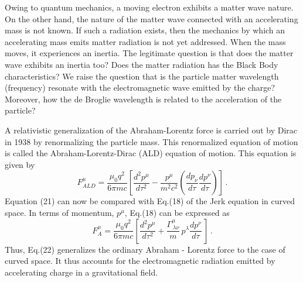 \documentclass[12pt]{article}
\begin{document}
Owing to  quantum mechanics, a moving electron exhibits a matter wave nature. On the other hand, the nature of the matter wave connected with an accelerating mass is not known. If such a radiation exists, then the mechanics by which an accelerating mass emits matter radiation is not yet addressed. When the mass moves, it experiences an inertia. The legitimate question is that does the matter wave exhibits an inertia too? Does the matter radiation has the Black Body characteristics? We raise the question that is the particle matter wavelength (frequency) resonate with the electromagnetic wave emitted by the charge? Moreover, how the de Broglie wavelength is related to the acceleration of the particle?

A relativistic generalization of the Abraham-Lorentz force is carried out by Dirac in 1938 by renormalizing the particle mass. This renormalized equation of motion is called the Abraham-Lorentz-Dirac (ALD) equation of motion. This equation is given by {\cite{abraham,lorentz,dirac}}
\begin{equation}
F^\mu_{ALD}=\frac{\mu_0q^2}{6\pi mc}\left[\frac{d^2p^\mu}{d\tau^2}-\frac{p^\mu}{m^2c^2}\left(\frac{dp_\nu}{d\tau}\frac{dp^\nu}{d\tau}\right)\right]\,.
\end{equation}
Equation (21) can now be compared with Eq.(18) of the Jerk equation in curved space. In terms of momentum, $p^\mu$, Eq.(18) can be expressed as
\begin{equation}
F^\mu_A=\frac{\mu_0 q^2}{6\pi mc}\left[\frac{d^2p^\mu}{d\tau^2}+\frac{\Gamma ^\mu_{\,\lambda\nu}}{m}\, p^\lambda\frac{dp^\nu}{d\tau}\,\right]\,.
\end{equation}
Thus, Eq.(22) generalizes the ordinary Abraham - Lorentz force to the case of curved space. It thus  accounts for the electromagnetic radiation emitted by accelerating charge in a gravitational field.
\end{document}
